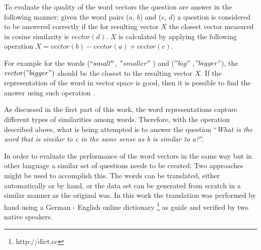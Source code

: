 To evaluate the quality of the word vectors the question  are answer in the
following manner: given the word pairs ($a$, $b$) and ($c$, $d$) a question
is considered to be answered correctly if the for resulting vector $X$ the closest vector measured in
cosine similarity is  $vector(d)$. $X$ is calculated by applying the following
operation $X = vector(b) - vector(a) + vector(c)$.  

 For example  for the words
($``small''$, $''smaller''$ ) and ($''big''$ ,$"bigger"$),
the $vector("bigger")$ should be the closest to the resulting
vector $X$. If the representation of the word in
vector space is good, then it is possible to find the answer using such
operation \cite{DBLP:journals/corr/abs-1301-3781}.

As discussed in the first part of this work, the word representations
capture different types of  similarities among words. Therefore, with the
operation described above,  what is  being
attempted is to answer the question ``\emph{What is the word that is similar to
c in the same sense as b is similar to a?}''. 


In order to evaluate the performance of the word vectors in the same way but in other language a
similar set of questions  needs to be created. Two approaches might be used
to accomplish this. The words can be translated, either automatically or by hand, or the data set can be
generated from scratch in a similar manner as the original was.  In this work
the translation was performed by hand using a German - English online dictionary \footnote{http://dict.cc} as guide and
verified by two native speakers.

